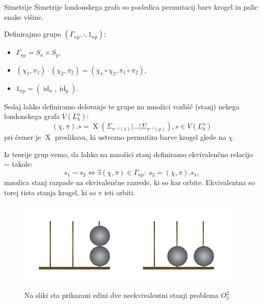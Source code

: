 \documentclass[dvipsnames]{beamer}
\DeclareMathOperator {\id} {id}
\DeclareMathOperator {\X}{X}
\begin{document}
\begin{frame}{Simetrije}
    Simetrije londonskega grafa so posledica permutacij barv krogel in palic enake višine.
    
    \medskip
    
    Definirajmo grupo $(\Gamma_{np}, \cdot, 1_{np})$:
    \begin{itemize}
        \item $\Gamma_{np} = S_n \times S_p$,
        \item $(\chi_1,\pi_1) \cdot (\chi_2,\pi_2) = (\chi_1 \circ \chi_2,\pi_1 \circ \pi_2), $
        \item  $1_{np} = (\id_n, \id_p).$
    \end{itemize}
\end{frame}

\begin{frame}
    Sedaj lahko definiramo delovanje te grupe na množici vozlišč (stanj) nekega londonskega grafa $V(L_h^n)$:
    \[ (\chi,\pi) . s = \X \left( \Sigma_{\pi^{-1}(1)} | \ldots | \Sigma_{\pi^{-1}(p)} \right), s \in V(L_h^n) \]
    pri čemer je $\X$ preslikava, ki ustrezno permutira barve krogel glede na $\chi$.
    
    \medskip
    
    Iz teorije grup vemo, da lahko na množici stanj definiramo ekvivalenčno relacijo $\sim$ takole:
    \[ s_1 \sim s_2 \iff \exists (\chi,\pi) \in \Gamma_{np}\colon \ s_2 = (\chi,\pi).s_1, \]
    množica stanj razpade na ekvivalenčne razrede, ki so kar orbite. Ekvivalentna so torej tista stanja krogel, ki so v isti orbiti.
\end{frame}

\begin{frame}
    \begin{figure}[h]
        \includegraphics[width=150pt]{../img/oxford-tower-O^2_3-towerlike.png}
        \includegraphics[width=150pt]{../img/oxford-tower-O^2_3-flat.png}
        \caption{Na sliki sta prikazani edini dve neekvivalentni stanji problema $O^2_3$. }
        \label{fig:neekviv-oxf-stanji}
    \end{figure}
\end{frame}
\end{document}
